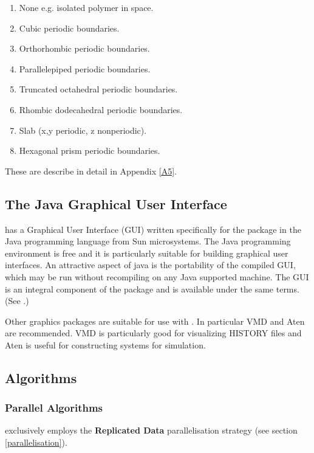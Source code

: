 \begin{enumerate}
\item None e.g. isolated polymer in space.
\item Cubic periodic boundaries.
\item Orthorhombic periodic boundaries.
\item Parallelepiped periodic boundaries.
\item Truncated octahedral periodic boundaries.
\item Rhombic dodecahedral periodic boundaries.
\item Slab (x,y periodic, z nonperiodic).
\item Hexagonal prism periodic boundaries.
\end{enumerate}

These are describe in detail in Appendix \ref{A5}.

\subsection{The Java Graphical User Interface}

\D{} has a Graphical User Interface (GUI) written specifically for the package
in the Java programming language from Sun microsystems.  The Java programming
environment is free and it is particularly suitable for building graphical
user interfaces. An attractive aspect of java is the portability of the
compiled GUI, which may be run without recompiling on any Java supported
machine. The GUI is an integral component of the \D{} package and is available
under the same terms. (See \cite{smith-gui}.)

Other graphics packages are suitable for use with \D. In particular
VMD \cite{VMD} and Aten \cite{aten}  are
recommended. VMD is particularly good for visualizing \DD{} HISTORY
files and Aten is useful for constructing systems for simulation.

\subsection{Algorithms}

\subsubsection{Parallel Algorithms}

\D{} exclusively employs the {\bf Replicated
  Data} parallelisation strategy
\cite{smith-94a,smith-94b} (see section \ref{parallelisation}).

